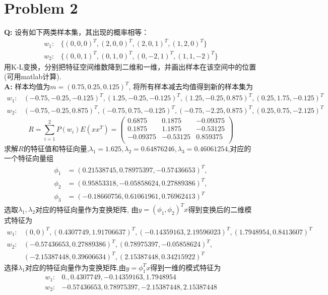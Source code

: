 \documentclass[12pt,a4paper]{article}
\begin{document}
\section{Problem 2}
\textbf{Q: }设有如下两类样本集，其出现的概率相等： 
\[
	\begin{split}
		w_1:&\{(0,0,0)^T, (2,0,0)^T, (2,0,1)^T, (1,2,0)^T\}  \\
		w_2:&\{(0,0,1)^T, (0,1,0)^T, (0,-2,1)^T, (1,1,-2)^T\}  
	\end{split}
\]
用K-L变换，分别把特征空间维数降到二维和一维，并画出样本在该空间中的位置(可用matlab计算). \\
\textbf{A: } 
 样本均值为$m = (0.75, 0.25, 0.125)^T$, 将所有样本减去均值得到新的样本集为
 \[
	 \begin{split} 
	 w_1:& (-0.75, -0.25, -0.125)^T, (1.25,-0.25,-0.125)^T,(1.25,-0.25,0.875)^T,(0.25,1.75,-0.125)^T \\
	 w_2:& (-0.75,-0.25,0.875)^T, (-0.75,0.75, -0.125)^T, (-0.75,-2.25,0.875)^T,(0.25,0.75,-2.125)^T
	 \end{split} 
 \]
\[
	R = \sum_{i=1}^{2}P(w_i)E(xx^T) = \left(\begin{array}{ccc}
	 0.6875 &   0.1875 &  -0.09375  \\
	  0.1875 &   1.1875&   -0.53125 \\
	 -0.09375&  -0.53125&   0.859375\\
	 \end{array}\right) 
\]
求解$R$的特征值和特征向量,$\lambda_1 = 1.625,\lambda_2= 0.64876246,\lambda_3 = 0.46061254$,对应的一个特征向量组
\[	\begin{split} 
	\phi_1 &= (0.21538745,0.78975397, -0.57436653 )^T, \\
	\phi_2 &= (0.95853318,-0.05858624,0.27889386 )^T,  \\
	\phi_3 &= (-0.18660756,0.61061961,0.76962413)^T
	\end{split} 
\]
选取$\lambda_1,\lambda_2$对应的特征向量作为变换矩阵, 由$ y = (\phi_1,\phi_2)^Tx$得到变换后的二维模式特征为
\[ \begin{split} 
	w_1: &(0,0)^T, (0.4307749,1.91706637)^T, (-0.14359163,2.19596023)^T, (1.7948954,0.8413607)^T \\
	w_2: &(-0.57436653, 0.27889386)^T, (0.78975397,-0.05858624)^T, \\ &(-2.15387448,0.39606634)^T, (2.15387448,0.34215922)^T	
	\end{split} 
\]
选择$\lambda_1$对应的特征向量作为变换矩阵,由$y = \phi_1^Tx$得到一维的模式特征为
\[
	\begin{split} 
	w_1: & 0.        ,  0.4307749 , -0.14359163,  1.7948954\\
	w_2: &-0.57436653, 0.78975397, -2.15387448,  2.15387448 
	\end{split} 	
\]
\end{document}
